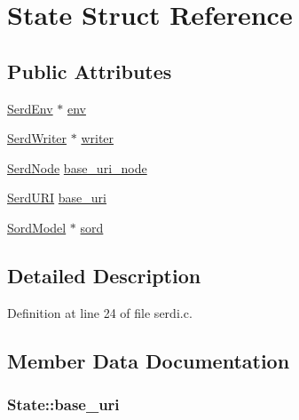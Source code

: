 \hypertarget{struct_state}{}\section{State Struct Reference}
\label{struct_state}
\subsection*{Public Attributes}
\begin{DoxyCompactItemize}
\item 
\hyperlink{group__serd_gaea4226dd80abea7afa05986f195d4755}{Serd\+Env} $\ast$ \hyperlink{struct_state_a9d1ce97fbd434a5c76816dd3cea68397}{env}
\item 
\hyperlink{group__serd_gaaaa09490e19dff0180251f1e2524e6f0}{Serd\+Writer} $\ast$ \hyperlink{struct_state_a65a95a4226135799bf09a1fe88517c5d}{writer}
\item 
\hyperlink{struct_serd_node}{Serd\+Node} \hyperlink{struct_state_ae1d0266d8239ebbf0f97946a2a9b65fb}{base\+\_\+uri\+\_\+node}
\item 
\hyperlink{struct_serd_u_r_i}{Serd\+U\+RI} \hyperlink{struct_state_a5b5b7a9915b0404abd8ec0ae86e35b1d}{base\+\_\+uri}
\item 
\hyperlink{group__sord_gaea018cfebfedd10280b1d8dd6d650a28}{Sord\+Model} $\ast$ \hyperlink{struct_state_a97ed8f5f8527bb8a27b3de4b659ed41e}{sord}
\end{DoxyCompactItemize}


\subsection{Detailed Description}


Definition at line 24 of file serdi.\+c.



\subsection{Member Data Documentation}
\subsubsection[{\texorpdfstring{base\+\_\+uri}{base_uri}}]{ State\+::base\+\_\+uri}\hypertarget{struct_state_a5b5b7a9915b0404abd8ec0ae86e35b1d}{}\label{struct_state_a5b5b7a9915b0404abd8ec0ae86e35b1d}


